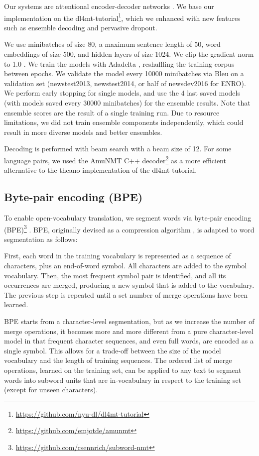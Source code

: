 \documentclass[11pt]{article}
\begin{document}
Our systems are attentional encoder-decoder networks \cite{DBLP:journals/corr/BahdanauCB14}.
We base our implementation on the dl4mt-tutorial\footnote{\url{https://github.com/nyu-dl/dl4mt-tutorial}}, which we enhanced with new features such as ensemble decoding and pervasive dropout.

We use minibatches of size 80, a maximum sentence length of 50, word embeddings of size 500, and hidden layers of size 1024.
We clip the gradient norm to 1.0 \cite{DBLP:conf/icml/PascanuMB13}.
We train the models with Adadelta \cite{DBLP:journals/corr/abs-1212-5701}, reshuffling the training corpus between epochs.
We validate the model every \num{10000} minibatches via {\sc Bleu} on a validation set (newstest2013, newstest2014, or half of newsdev2016 for ENRO).
We perform early stopping for single models, and use the 4 last saved models (with models saved every \num{30000} minibatches) for the ensemble results.
Note that ensemble scores are the result of a single training run.
Due to resource limitations, we did not train ensemble components independently, which could result in more diverse models and better ensembles.

Decoding is performed with beam search with a beam size of 12.
For some language pairs, we used the AmuNMT C++ decoder\footnote{\url{https://github.com/emjotde/amunmt}} as a more efficient alternative to the theano implementation of the dl4mt tutorial.

\subsection{Byte-pair encoding (BPE)}

To enable open-vocabulary translation, we segment words via byte-pair encoding (BPE)\footnote{\url{https://github.com/rsennrich/subword-nmt}} \cite{DBLP:journals/corr/SennrichHB15}.
BPE, originally devised as a compression algorithm \cite{Gage:1994:NAD:177910.177914}, is adapted to word segmentation as follows:

First, each word in the training vocabulary is represented as a sequence of characters, plus an end-of-word symbol.
All characters are added to the symbol vocabulary.
Then, the most frequent symbol pair is identified, and all its occurrences are merged, producing a new symbol that is added to the vocabulary.
The previous step is repeated until a set number of merge operations have been learned.

BPE starts from a character-level segmentation, but as we increase the number of merge operations, it becomes more and more different from a pure character-level model in that frequent character sequences, and even full words, are encoded as a single symbol.
This allows for a trade-off between the size of the model vocabulary and the length of training sequences.
The ordered list of merge operations, learned on the training set, can be applied to any text to segment words into subword units that are in-vocabulary in respect to the training set (except for unseen characters).
\end{document}
